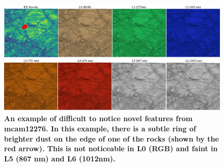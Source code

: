 \begin{figure}
\centering
\includegraphics[width=\linewidth]{figs/1/mcam_novel.png}
\caption{\textbf{An example of difficult to notice novel features from mcam12276. In this example, there is a subtle ring of brighter dust on the edge of one of the rocks (shown by the red arrow). This is not noticeable in L0 (RGB) and faint in L5 (867 nm) and L6 (1012nm).}}
\label{chap1/fig:mcam12276}
\end{figure}

